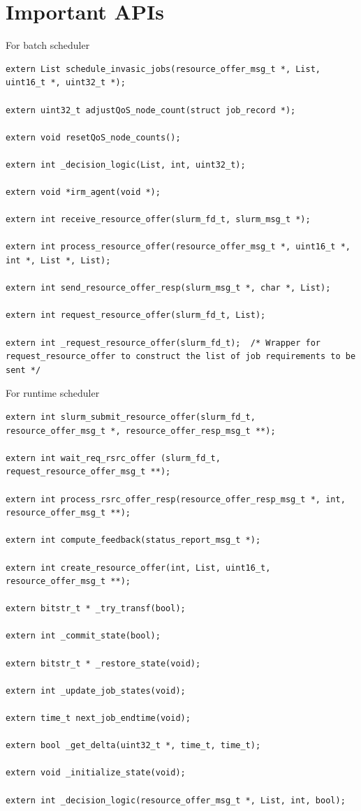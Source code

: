 \section{Important APIs}
For batch scheduler\\
\begin{lstlisting}[mathescape]
extern List schedule_invasic_jobs(resource_offer_msg_t *, List, uint16_t *, uint32_t *);

extern uint32_t adjustQoS_node_count(struct job_record *);

extern void resetQoS_node_counts();

extern int _decision_logic(List, int, uint32_t);

extern void *irm_agent(void *);

extern int receive_resource_offer(slurm_fd_t, slurm_msg_t *);

extern int process_resource_offer(resource_offer_msg_t *, uint16_t *, int *, List *, List);

extern int send_resource_offer_resp(slurm_msg_t *, char *, List);

extern int request_resource_offer(slurm_fd_t, List);

extern int _request_resource_offer(slurm_fd_t);  /* Wrapper for request_resource_offer to construct the list of job requirements to be sent */
\end{lstlisting}
For runtime scheduler\\
\begin{lstlisting}[mathescape]
extern int slurm_submit_resource_offer(slurm_fd_t, resource_offer_msg_t *, resource_offer_resp_msg_t **);

extern int wait_req_rsrc_offer (slurm_fd_t, request_resource_offer_msg_t **);

extern int process_rsrc_offer_resp(resource_offer_resp_msg_t *, int, resource_offer_msg_t **);

extern int compute_feedback(status_report_msg_t *);

extern int create_resource_offer(int, List, uint16_t, resource_offer_msg_t **);

extern bitstr_t * _try_transf(bool);

extern int _commit_state(bool);

extern bitstr_t * _restore_state(void);

extern int _update_job_states(void);

extern time_t next_job_endtime(void);

extern bool _get_delta(uint32_t *, time_t, time_t);

extern void _initialize_state(void);

extern int _decision_logic(resource_offer_msg_t *, List, int, bool);
\end{lstlisting}
